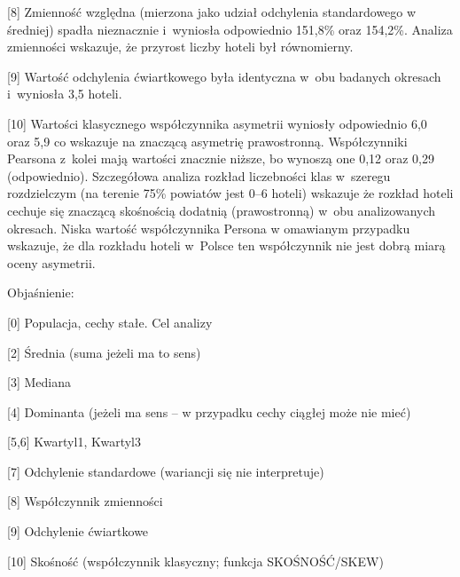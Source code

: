 \documentclass[a4page,11pt]{article}
\begin{document}
[8] Zmienność względna (mierzona jako udział odchylenia standardowego
w średniej) spadła nieznacznie i~wyniosła odpowiednio 151,8\% oraz
154,2\%. Analiza zmienności wskazuje,
że przyrost liczby hoteli był równomierny.

[9] Wartość odchylenia ćwiartkowego była identyczna
w~obu badanych  okresach i~wyniosła 3,5 hoteli.

[10] Wartości klasycznego współczynnika asymetrii wyniosły odpowiednio
6,0 oraz 5,9 co wskazuje na znaczącą asymetrię
prawostronną. Współczynniki Pearsona z kolei mają wartości znacznie
niższe, bo wynoszą one 0,12 oraz 0,29 (odpowiednio).  Szczegółowa
analiza rozkład liczebności klas w~szeregu rozdzielczym (na terenie
75\% powiatów jest 0--6 hoteli) wskazuje że rozkład hoteli cechuje się
znaczącą skośnością dodatnią (prawostronną) w~obu analizowanych
okresach.  Niska wartość współczynnika Persona w omawianym przypadku
wskazuje, że dla rozkładu hoteli w~Polsce ten współczynnik nie jest
dobrą miarą oceny asymetrii.

\begin{small}
Objaśnienie:

[0] Populacja, cechy stałe. Cel analizy

[2] Średnia (suma jeżeli ma to sens)

[3] Mediana

[4] Dominanta (jeżeli ma sens -- w przypadku cechy ciągłej może nie mieć)

[5,6] Kwartyl1, Kwartyl3

[7] Odchylenie standardowe (wariancji się nie interpretuje)

[8] Współczynnik zmienności

[9] Odchylenie ćwiartkowe

[10] Skośność (współczynnik klasyczny; funkcja SKOŚNOŚĆ/SKEW)

\end{small}
\end{document}
